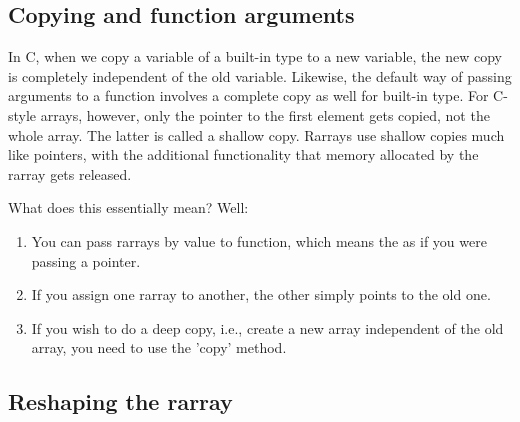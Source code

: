 \documentclass[12pt,twoside]{article}
\begin{document}
\subsection{Copying and function arguments}

In C, when we copy a variable of a built-in type to a new variable, the new copy is completely independent of the old variable. Likewise, the default way of passing arguments to a function involves a complete copy as well for built-in type.  For C-style arrays, however, only the pointer to the first element gets copied, not the whole array. The latter is called a shallow copy. Rarrays use shallow copies much like pointers, with the additional functionality that memory allocated by the rarray gets released. 

What does this essentially mean? Well:
\begin{enumerate}
\item You can pass rarrays by value to function, which means the as if you were passing a pointer.
\item If you assign one rarray to another, the other simply points to the old one.
\item If you wish to do a deep copy, i.e., create a new array independent of the old array, you need to use the 'copy' method.
\end{enumerate}

\subsection{Reshaping the rarray}
\end{document}
